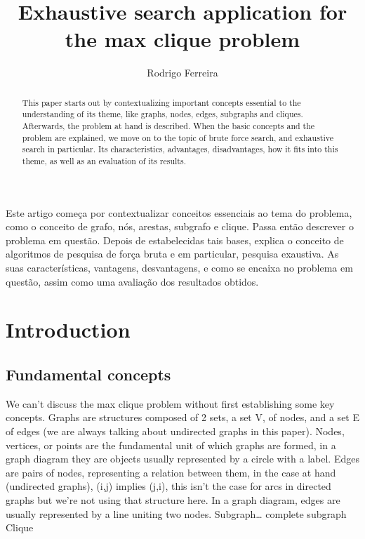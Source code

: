 \documentclass[...]{revdetua}
\begin{document}

\title{Exhaustive search application for the max clique problem}
\author{Rodrigo Ferreira} %
\maketitle

\begin{resumo}%
 Este artigo começa por contextualizar conceitos essenciais ao tema do problema, como o conceito de grafo, nós, arestas, subgrafo e clique. Passa então descrever o problema em questão. Depois de estabelecidas tais bases, explica o conceito de algoritmos de pesquisa de força bruta e em particular, pesquisa exaustiva. As suas características, vantagens, desvantagens, e como se encaixa no problema em questão, assim como uma avaliação dos resultados obtidos.
\end{resumo}

\begin{abstract}%
  This paper starts out by contextualizing important concepts essential to the understanding of its theme, like graphs, nodes, edges, subgraphs and cliques. Afterwards, the problem at hand is described. When the basic concepts and the problem are explained, we move on to the topic of brute force search, and exhaustive search in particular. Its characteristics, advantages, disadvantages, how it fits into this theme, as well as an evaluation of its results.
\end{abstract}
\section{Introduction}
\subsection{Fundamental concepts}
We can’t discuss the max clique problem without first establishing some key concepts.
Graphs are structures composed of 2 sets, a set V, of nodes, and a set E of edges (we are always talking about undirected graphs in this paper).
Nodes, vertices, or points are the fundamental unit of which graphs are formed, in a graph diagram they are objects usually represented by a circle with a label.
Edges are pairs of nodes, representing a relation between them, in the case at hand (undirected graphs), (i,j) implies (j,i), this isn’t the case for arcs in directed graphs but we’re not using that structure here. In a graph diagram, edges are usually represented by a line uniting two nodes.
Subgraph…
complete subgraph
Clique
\end{document}
